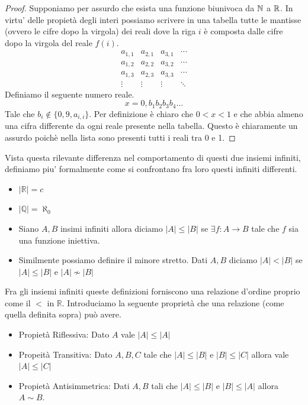 \begin{proof}
    Supponiamo per assurdo che esista una funzione biunivoca da $\mathbb{N}$ a $\mathbb{R}$. In virtu' delle propietà degli interi possiamo scrivere in una tabella tutte le  mantisse (ovvero le cifre dopo la virgola) dei reali dove la riga $i$ è composta dalle cifre dopo la virgola del reale $f(i)$.
    \begin{equation}
    \begin{matrix}
        a_{1,1} & a_{2,1} & a_{3,1} & \cdots \\
        a_{1,2} & a_{2,2} & a_{3,2} & \cdots \\
        a_{1,3} & a_{2,3} & a_{3,3} & \cdots \\
        \vdots & \vdots & \vdots & \ddots
    \end{matrix}
\end{equation}
    Definiamo il seguente numero reale.
    \begin{equation}
    x = 0,b_1b_2b_3b_4\dots
    \end{equation}
    Tale che $b_i \not \in \{0,9,a_{i,i} \}$. Per definizione è chiaro che $0<x<1$ e che abbia almeno una cifra differente da ogni reale presente nella tabella. Questo è chiaramente un assurdo poichè nella lista sono presenti tutti i reali tra 0 e 1.
\end{proof}
Vista questa rilevante differenza nel comportamento di questi due insiemi infiniti, definiamo piu' formalmente come si confrontano fra loro questi infiniti differenti.
\begin{definition}{}
    \begin{itemize}
        \item $|\mathbb{R}| = c$
        \item $|\mathbb{Q}| = \aleph_0$
        \item Siano $A,B$ insimi infiniti allora diciamo $|A|\le|B|$ se $\exists f:A\rightarrow B$ tale che $f$ sia una funzione iniettiva.
        \item Similmente possiamo definire il minore stretto. Dati $A,B$ diciamo $|A|<|B|$ se $|A|\le|B|$ e $|A|\not \sim |B|$
    \end{itemize}
\end{definition}
Fra gli insiemi infiniti queste definizioni forniscono una relazione d'ordine proprio come il $<$ in $\mathbb{R}$.
Introduciamo la seguente proprietà che una relazione (come quella definita sopra) può avere.
\begin{itemize}
    \item Propietà Riflessiva: Dato $A$ vale $|A|\le |A|$
    \item Propeità Transitiva: Dato $A,B,C$ tale che $|A|\le |B|$ e $|B|\le |C|$ allora vale $|A| \le |C|$
    \item Propietà Antisimmetrica: Dati $A,B$ tali che $|A|\le |B|$ e $|B|\le|A|$ allora $A\sim B$.
\end{itemize}
